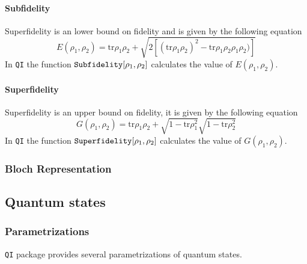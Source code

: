 \documentclass[11pt,a4paper]{article}
\newcommand{\qi}{\texttt{QI}}
\newcommand{\tr}{\mathrm{tr}}
\newcommand{\1}{{\bf 1}}
\newcommand{\fname}[1]{\text{\texttt{#1}}}
\begin{document}
\paragraph{Subfidelity}
Superfidelity is an lower bound on fidelity 
\cite{miszczak2008sup}
and is given by the following equation
\begin{equation}
E(\rho_1,\rho_2)=
\tr\rho_1\rho_2+\sqrt{2[(\tr\rho_1\rho_2)^2-\tr\rho_1\rho_2\rho_1\rho_2)]}
\end{equation}
In \qi{} the function $\fname{Subfidelity}[\rho_1,\rho_2]$ calculates the 
value of $E(\rho_1,\rho_2)$.

\paragraph{Superfidelity} Superfidelity is an upper bound on fidelity,
it is given by the following equation
\begin{equation}
G(\rho_1,\rho_2)=\tr\rho_1\rho_2+\sqrt{1-\tr\rho_1^2}\sqrt{1-\tr\rho_2^2}
\end{equation}
In \qi{} the function $\fname{Superfidelity}[\rho_1,\rho_2]$ calculates the 
value of $G(\rho_1,\rho_2)$.

\subsubsection{Bloch Representation}

\subsection{Quantum states}

\subsubsection{Parametrizations}
\qi{} package provides several parametrizations of quantum states. 
\end{document}
